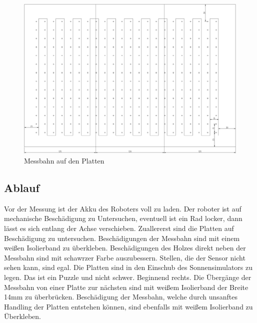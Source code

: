 \documentclass[a4paper,bibtotoc,oneside]{scrbook}
\begin{document}
\begin{figure}[htbp]
\centering
\includegraphics[width=125mm]{img/dreiplatten10.png}
\caption{Messbahn auf den Platten}\label{platten}
\end{figure}



\subsection{Ablauf}\thispagestyle{empty}
Vor der Messung ist der Akku des Roboters voll zu laden. Der roboter ist auf mechanische Beschädigung zu Untersuchen, eventuell ist ein Rad locker, dann lässt es sich entlang der Achse verschieben.
Zuallererst sind die Platten auf Beschädigung zu untersuchen. Beschädigungen der Messbahn sind mit einem weißen Isolierband zu überkleben. Beschädigungen des Holzes direkt neben der Messbahn sind mit schawrzer Farbe auszubessern. Stellen, die der Sensor nicht sehen kann, sind egal.
Die Platten sind in den Einschub des Sonnensimulators zu legen. Das ist ein Puzzle und nicht schwer. Beginnend rechts. Die Übergänge der Messbahn von einer Platte zur nächsten sind mit weißem Isolierband  der Breite 14mm zu überbrücken. Beschädigung der Messbahn, welche durch unsanftes Handling der Platten entstehen können, sind ebenfalls mit weißem Isolierband zu Überkleben.
\end{document}
